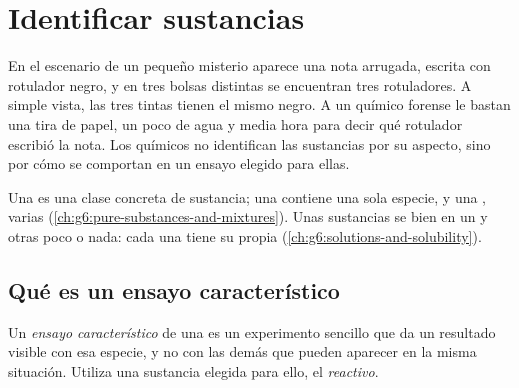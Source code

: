 \chapter{Identificar sustancias}\label{ch:g7:identifying-substances}

En el escenario de un pequeño misterio aparece una nota arrugada,
escrita con rotulador negro, y en tres bolsas distintas se encuentran
tres rotuladores. A simple vista, las tres tintas tienen el mismo negro.
A un químico forense le bastan una tira de papel, un poco de agua y
media hora para decir qué rotulador escribió la nota. Los químicos no
identifican las sustancias por su aspecto, sino por cómo se comportan en
un ensayo elegido para ellas.

\begin{recall}
Una  es una clase concreta de sustancia; una  contiene una sola especie, y una , varias
(\cref{ch:g6:pure-substances-and-mixtures}). Unas sustancias se
 bien en un  y otras poco o nada: cada una tiene su
propia  (\cref{ch:g6:solutions-and-solubility}).
\end{recall}

\section{Qué es un ensayo característico}

\begin{definition}\label{def:g7:identifying-substances:characteristic-test}
Un \emph{ensayo característico} de una
 es un experimento sencillo que da un resultado visible
con esa especie, y no con las demás que pueden aparecer en la misma
situación. Utiliza una sustancia elegida para ello, el
\emph{reactivo}.
\end{definition}


